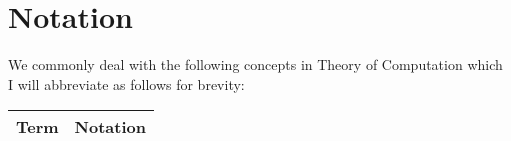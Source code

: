 \section{Notation}

We commonly deal with the following concepts in 
Theory of Computation
which I will abbreviate as follows for brevity:
\begin{center}
    \begin{tabular}{ | r | c | }
        \hline
        Term & Notation \\
        \hline \hline
        \hline
    \end{tabular}
\end{center}